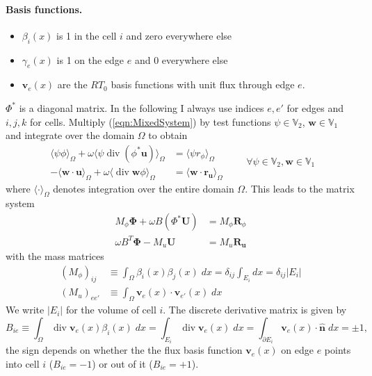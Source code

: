\documentclass[12pt]{article}
\renewcommand{\vec}[1]{\boldsymbol{#1}}
\newcommand{\divergence}{\operatorname{div}}
\newcommand{\intOmega}[1]{\langle#1\rangle_{\Omega}}
\newcommand{\Vpressure}{\mathbb{V}_2}
\newcommand{\Vvelocity}{\mathbb{V}_1}
\begin{document}
\paragraph{Basis functions.}
\begin{itemize}
  \item $\beta_i(x)$ is 1 in the cell $i$ and zero everywhere else
	\item $\gamma_e(x)$ is 1 on the edge $e$ and 0 everywhere else
  \item $\vec{v}_e(x)$ are the $RT_0$ basis functions with unit flux through edge $e$.
\end{itemize}
$\Phi^*$ is a diagonal matrix. In the following I always use indices $e,e'$ for edges and $i,j,k$ for cells.
Multiply (\ref{eqn:MixedSystem}) by test functions $\psi\in \Vpressure$, $\vec{w}\in\Vvelocity$ and integrate over the domain $\Omega$ to obtain 
\begin{equation}
 \begin{aligned}
  \intOmega{\psi \phi} + \omega \intOmega{\psi \divergence(\phi^* \vec{u})} &= 
  \intOmega{\psi r_{\phi}} \\
  -\intOmega{\vec{w}\cdot\vec{u}} + \omega \intOmega{\divergence \vec{w} \phi} &= \intOmega{\vec{w}\cdot \vec{r}_{\vec{u}}}
 \end{aligned}
 \qquad\forall{\psi\in\Vpressure, \vec{w}\in\Vvelocity}
\end{equation}
where $\intOmega{\cdot}$ denotes integration over the entire domain $\Omega$.
This leads to the matrix system
\begin{equation}
 \begin{aligned}
  M_{\phi} \vec{\Phi} + \omega B (\Phi^* \vec{U}) &= M_{\phi}\vec{R}_\phi \\
  \omega B^T \vec{\Phi} - M_{u} \vec{U} &= M_u \vec{R}_{\vec{u}}
 \end{aligned}
\label{eqn:MatrixSystem}
\end{equation}
with the mass matrices
\begin{equation}
 \begin{aligned}
  \left(M_{\phi}\right)_{ij} &\equiv \int_{\Omega} \beta_{i}(x)\beta_j(x)\;dx = \delta_{ij} \int_{E_i} dx = \delta_{ij} |E_i| \\
  \left(M_{u}\right)_{ee'} &\equiv \int_{\Omega} \vec{v}_e(x)\cdot \vec{v}_{e'}(x)\; dx
 \end{aligned}
\end{equation}
We write $|E_i|$ for the volume of cell $i$. The discrete derivative matrix is given by
\begin{equation}
  B_{ie} \equiv \int_{\Omega} \divergence \vec{v}_e(x) \beta_i(x)\; dx = \int_{E_i} \divergence \vec{v}_e(x) \;dx = \int_{\partial E_i} \vec{v}_e(x)\cdot \hat{\vec{n}} \; dx = \pm 1,
\end{equation}
the sign depends on whether the the flux basis function $\vec{v}_e(x)$ on edge $e$ points into cell $i$ ($B_{ie} = -1$) or out of it ($B_{ie}=+1$).
\end{document}
